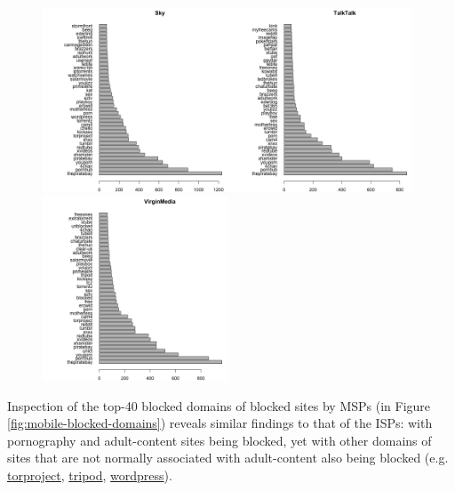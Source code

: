 \documentclass{bmcart}
\begin{document}
\begin{figure}[h!]
\includegraphics[width=0.49\textwidth]{imgs/Sky-blocked-pages-to-date.png}\includegraphics[width=0.49\textwidth]{imgs/TalkTalk-blocked-pages-to-date}
\includegraphics[width=0.49\textwidth]{imgs/VirginMedia-blocked-pages-to-date}
\label{fig:broadband-blocked-domains}
\end{figure}

Inspection of the top-40 blocked domains of blocked sites by MSPs (in Figure \ref{fig:mobile-blocked-domains}) reveals similar findings to that of the ISPs: with pornography and adult-content sites being blocked, yet with other domains of sites that are not normally associated with adult-content also being blocked (e.g. \url{torproject}, \url{tripod}, \url{wordpress}).
\end{document}
